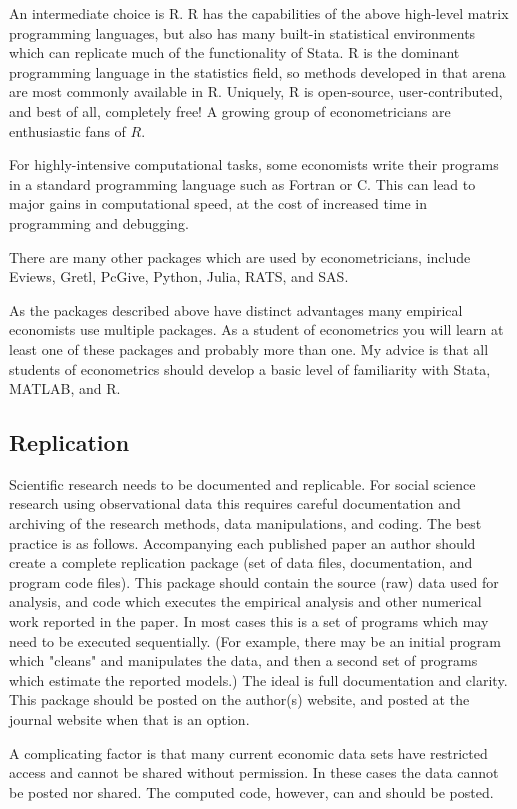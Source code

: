 \documentclass[10pt]{article}
\begin{document}
An intermediate choice is R. R has the capabilities of the above high-level matrix programming languages, but also has many built-in statistical environments which can replicate much of the functionality of Stata. R is the dominant programming language in the statistics field, so methods developed in that arena are most commonly available in R. Uniquely, R is open-source, user-contributed, and best of all, completely free! A growing group of econometricians are enthusiastic fans of $R$.

For highly-intensive computational tasks, some economists write their programs in a standard programming language such as Fortran or C. This can lead to major gains in computational speed, at the cost of increased time in programming and debugging.

There are many other packages which are used by econometricians, include Eviews, Gretl, PcGive, Python, Julia, RATS, and SAS.

As the packages described above have distinct advantages many empirical economists use multiple packages. As a student of econometrics you will learn at least one of these packages and probably more than one. My advice is that all students of econometrics should develop a basic level of familiarity with Stata, MATLAB, and R.

\subsection{Replication}
Scientific research needs to be documented and replicable. For social science research using observational data this requires careful documentation and archiving of the research methods, data manipulations, and coding. The best practice is as follows. Accompanying each published paper an author should create a complete replication package (set of data files, documentation, and program code files). This package should contain the source (raw) data used for analysis, and code which executes the empirical analysis and other numerical work reported in the paper. In most cases this is a set of programs which may need to be executed sequentially. (For example, there may be an initial program which "cleans" and manipulates the data, and then a second set of programs which estimate the reported models.) The ideal is full documentation and clarity. This package should be posted on the author(s) website, and posted at the journal website when that is an option.

A complicating factor is that many current economic data sets have restricted access and cannot be shared without permission. In these cases the data cannot be posted nor shared. The computed code, however, can and should be posted.
\end{document}

